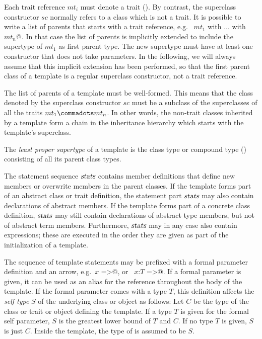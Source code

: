 Each trait reference $mt_i$ must denote a trait ().
By contrast, the superclass constructor $sc$ normally refers to a
class which is not a trait. It is possible to write a list of
parents that starts with a trait reference, e.g.
~\lstinline@$mt_1$ with $\ldots$ with $mt_n$@. In that case the list
of parents is implicitly extended to include the supertype of $mt_1$
as first parent type. The new supertype must have at least one
constructor that does not take parameters.  In the following, we will
always assume that this implicit extension has been performed, so that
the first parent class of a template is a regular superclass
constructor, not a trait reference.

The list of parents of a template must be well-formed. This means that
the class denoted by the superclass constructor $sc$ must be a
subclass of the superclasses of all the traits $mt_1 \commadots mt_n$.
In other words, the non-trait classes inherited by a template form a
chain in the inheritance hierarchy which starts with the template's
superclass.

The {\em least proper supertype} of a template is the class type or
compound type () consisting of all its parent
class types. 

The statement sequence $\mbox{\sl stats}$ contains member definitions that
define new members or overwrite members in the parent classes.  If the
template forms part of an abstract class or trait definition, the
statement part $\mbox{\sl stats}$ may also contain declarations of abstract
members. If the template forms part of a concrete class definition,
$\mbox{\sl stats}$ may still contain declarations of abstract type members, but
not of abstract term members.  Furthermore, $\mbox{\sl stats}$ may in any case
also contain expressions; these are executed in the order they are
given as part of the initialization of a template.

The sequence of template statements may be prefixed with a formal
parameter definition and an arrow, e.g.\ \lstinline@$x$ =>@, or
~\lstinline@$x$:$T$ =>@.  If a formal parameter is given, it can be
used as an alias for the reference \lstinline@this@ throughout the
body of the template.  
If the formal parameter comes with a type $T$, this definition affects
the {\em self type} $S$ of the underlying class or object as follows:  Let $C$ be the type
of the class or trait or object defining the template.
If a type $T$ is given for the formal self parameter, $S$
is the greatest lower bound of $T$ and $C$.
If no type $T$ is given, $S$ is just $C$.
Inside the template, the type of  is assumed to be $S$.

